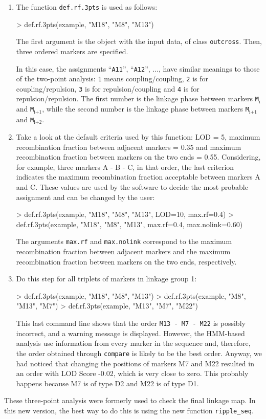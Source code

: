\documentclass[letterpaper,12pt,oneside]{article}
\begin{document}
\begin{enumerate}
\item The function {\tt def.rf.3pts} is used as follows:
\begin{Schunk}
\begin{Sinput}
> def.rf.3pts(example, "M18", "M8", "M13")
\end{Sinput}
\end{Schunk}
The first argument is the object with the input data, of class {\tt outcross}. Then, three ordered markers are specified.

In this case, the assignments ``{\tt A11}'', ``{\tt A12}'', $\ldots$, have similar meanings to those of the two-point analysis: {\tt 1} means coupling/coupling, {\tt 2} is for coupling/repulsion, {\tt 3} is for repulsion/coupling and {\tt 4} is for repulsion/repulsion. The first number is the linkage phase between markers {\tt M$_{\mbox{i}}$} and {\tt M$_{\mbox{i+1}}$}, while the second number is the linkage phase between markers {\tt M$_{\mbox{i+1}}$} and {\tt M$_{\mbox{i+2}}$}.

\item Take a look at the default criteria used by this function: LOD = 5, maximum recombination fraction between adjacent markers = 0.35 and maximum recombination fraction between markers on the two ends = 0.55. Considering, for example, three markers A - B - C, in that order, the last criterion indicates the maximum recombination fraction acceptable between markers A and C. These values are used by the software to decide the most probable assignment and can be changed by the user:
\begin{Schunk}
\begin{Sinput}
> def.rf.3pts(example, "M18", "M8", "M13", LOD=10, max.rf=0.4)
> def.rf.3pts(example, "M18", "M8", "M13", max.rf=0.4, max.nolink=0.60)
\end{Sinput}
\end{Schunk}
The arguments {\tt max.rf} and {\tt max.nolink} correspond to the maximum recombination fraction between adjacent markers and the maximum recombination fraction between markers on the two ends, respectively.

\item Do this step for all triplets of markers in linkage group 1:
\begin{Schunk}
\begin{Sinput}
> def.rf.3pts(example, "M18", "M8", "M13")
> def.rf.3pts(example, "M8", "M13", "M7")
> def.rf.3pts(example, "M13", "M7", "M22")
\end{Sinput}
\end{Schunk}
This last command line shows that the order {\tt M13 - M7 - M22} is possibly incorrect, and a warning message is displayed. However, the HMM-based analysis use information from every marker in the sequence and, therefore, the order obtained through {\tt compare} is likely to be the best order. Anyway, we had noticed that changing the positions of markers M7 and M22 resulted in an order with LOD Score -0.02, which is very close to zero. This probably happens because M7 is of type D2 and M22 is of type D1.
\end{enumerate}

These three-point analysis were formerly used to check the final linkage map. In this new version, the best way to do this is using the new function {\tt ripple_seq}.
\end{document}

